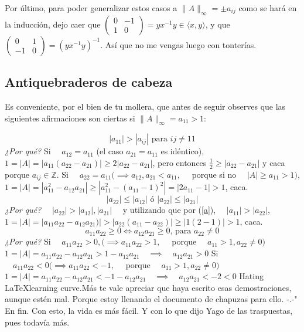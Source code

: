 \documentclass{article}
\newcommand\tab[1][0.6cm]{\hspace*{#1}}
\newcommand\nl{\newline\tab}
\begin{document}
	Por último, para poder generalizar estos casos a  $\|A\|_\infty = \pm a_{ij}$ como se hará en la inducción, dejo caer que
	$\begin{pmatrix}
	0 & -1 \\
	1 & 0 
	\end{pmatrix} = yx^{-1}y \in \langle x, y \rangle$, y que $\begin{pmatrix}
	0 & 1 \\
	-1 & 0 
	\end{pmatrix} = \left(yx^{-1}y\right)^{-1}$. Así que no me vengas luego con tonterías.\nl\nl
	
	
	
	\subsection{Antiquebraderos de cabeza}
	\tab Es conveniente, por el bien de tu mollera, que antes de seguir observes que las siguientes afirmaciones son ciertas si $\|A\|_\infty = a_{11} > 1$:
	
	\begin{equation}\label{a}
	|a_{11}| > |a_{ij}| \text{ para } ij \neq 11 
	\end{equation}
	\nl 
	\textit{¿Por qué?}\nl 
	Si $\quad a_{12} = a_{11}$ (el caso $a_{21} = a_{11}$ es idéntico),\nl 
	\tab$1 = |A| = |a_{11}(a_{22}-a_{21})| \geq 2|a_{22}-a_{21}|$, pero entonces $\frac{1}{2} \geq |a_{22}-a_{21}|$ y caca porque $a_{ij} \in\mathbb{Z} $.\nl
	Si $\quad a_{22} = a_{11} (\implies a_{12}, a_{21} < a_{11},\quad$ porque si no $\quad|A| \geq a_{11} > 1)$,\nl 
	\tab $1 = |A| = |a_{11}^2-a_{12}a_{21}| \geq |a_{11}^2-(a_{11}-1)^2| = |2a_{11} - 1 | > 1$, caca.\nl\nl
	\begin{equation}\label{b}
	|a_{22}| \leq |a_{12}| \text{ ó } |a_{22}| \leq|a_{21}|
	\end{equation}
	\nl 
	\textit{¿Por qué?}\nl 
	 $\quad|a_{22}| > |a_{12}|, |a_{21}|\quad$  y utilizando que por (\ref{a}), $\quad |a_{11}| > |a_{22}|$, \nl 
	\tab $1 = |A| = |a_{11}a_{22}-a_{12}a_{21})| > |a_{22}(a_{11}-a_{22})| \geq |1(2 - 1)| > 1 $, caca.\nl\nl
	\begin{equation}\label{c}
	a_{11}a_{22}\geq 0 \iff a_{12}a_{21}\geq 0\text{, para } a_{22} \neq 0
	\end{equation}
	\nl 
	\textit{¿Por qué?}\nl 
	Si $\quad a_{11}a_{22} > 0, (\implies a_{11}a_{22} > 1,\quad$ porque $\quad a_{11} > 1, a_{22} \neq 0)$\nl\tab 
	$1 = |A| = a_{11}a_{22} - a_{12}a_{21} > 1 - a_{12}a_{21} \quad\implies\quad a_{12}a_{21} > 0$\nl
	Si $\quad a_{11}a_{22} < 0 (\implies a_{11}a_{22} < - 1,\quad$ porque $\quad a_{11} > 1, a_{22} 	\neq 0)$\nl\tab 
	$1 = |A| = a_{11}a_{22} - a_{12}a_{21} < - 1 - a_{12}a_{21} \quad\implies\quad a_{12}a_{21} < -2 < 0$\nl\nl 
	Hating \LaTeX\space  learning curve.\nl	Más te vale apreciar que haya escrito esas demostraciones, aunque estén mal. Porque estoy llenando el documento de chapuzas para ello. -.-"\nl 	
	En fin. Con esto, la vida es más fácil. Y con lo que dijo Yago de las traspuestas, pues todavía más.\nl
\end{document}

